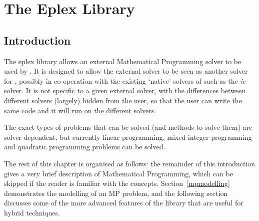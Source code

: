 %
% 
% 
% 
% 

\chapter{The Eplex Library}
\label{chapeplex}

\section{Introduction}

The eplex library allows an external Mathematical Programming solver to be
used by {\eclipse}. It is designed to allow the external solver to be seen
as another solver for {\eclipse}, possibly in co-operation with
the existing `native' solvers of {\eclipse} such as the {\it ic\/} solver. It is
not specific to a given external solver, with the differences between
different solvers (largely) hidden from the user, so that the user can
write the same code and it will run on the different solvers.

The exact types of problems that can be solved (and methods to solve them)
are solver dependent, but currently linear programming, mixed integer
programming and quadratic programming problems can be solved.

The rest of this chapter is organised as follows: the remainder of this
introduction gives a very brief description of Mathematical Programming, which
can be skipped if the reader is familiar with the concepts. 
Section~\ref{mpmodelling} demonstrates the modelling of an MP problem, and the
following section discusses some of the more advanced features of the library
that are useful for hybrid techniques.

